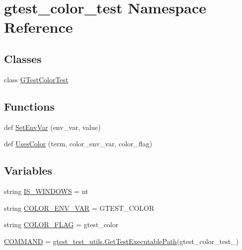 \hypertarget{namespacegtest__color__test}{}\section{gtest\+\_\+color\+\_\+test Namespace Reference}
\label{namespacegtest__color__test}
\subsection*{Classes}
\begin{DoxyCompactItemize}
\item 
class \hyperlink{classgtest__color__test_1_1GTestColorTest}{G\+Test\+Color\+Test}
\end{DoxyCompactItemize}
\subsection*{Functions}
\begin{DoxyCompactItemize}
\item 
def \hyperlink{namespacegtest__color__test_af8659dcaaf59478690f30d7ac141b1c4}{Set\+Env\+Var} (env\+\_\+var, value)
\item 
def \hyperlink{namespacegtest__color__test_a96a2e5fa77bff1cba4a791ad1e5bdafa}{Uses\+Color} (term, color\+\_\+env\+\_\+var, color\+\_\+flag)
\end{DoxyCompactItemize}
\subsection*{Variables}
\begin{DoxyCompactItemize}
\item 
string \hyperlink{namespacegtest__color__test_a0d4451a99f88105308f0842eb3ec2938}{I\+S\+\_\+\+W\+I\+N\+D\+O\+WS} = \textquotesingle{}nt\textquotesingle{}
\item 
string \hyperlink{namespacegtest__color__test_aa6deaa7da27bcc115fe666abad13419c}{C\+O\+L\+O\+R\+\_\+\+E\+N\+V\+\_\+\+V\+AR} = \textquotesingle{}G\+T\+E\+S\+T\+\_\+\+C\+O\+L\+OR\textquotesingle{}
\item 
string \hyperlink{namespacegtest__color__test_af5818cea608c0551909fefbeaf0edf20}{C\+O\+L\+O\+R\+\_\+\+F\+L\+AG} = \textquotesingle{}gtest\+\_\+color\textquotesingle{}
\item 
\hyperlink{namespacegtest__color__test_a5b2d1937052a86cc99b722dd0db8e4fc}{C\+O\+M\+M\+A\+ND} = \hyperlink{namespacegtest__test__utils_a89ed3717984a80ffbb7a9c92f71b86a2}{gtest\+\_\+test\+\_\+utils.\+Get\+Test\+Executable\+Path}(\textquotesingle{}gtest\+\_\+color\+\_\+test\+\_\+\textquotesingle{})
\end{DoxyCompactItemize}


